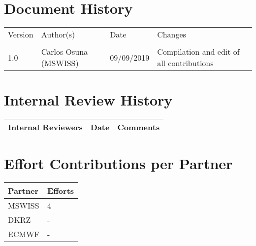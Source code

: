 \documentclass[a4paper,10pt,twoside]{article}
\begin{document}


\clearpage
%
\cleardoublepage


\tableofcontents
\listoffigures
\listoftables

%

\newpage
\mbox{}\newpage









\section{Document History}

\begin{tabular}{|l|l|l|l|}
	\hline
	Version & Author(s) & Date & Changes \\ 
	&&& \\  \hline
	1.0 & Carlos Osuna (MSWISS) & 09/09/2019 & Compilation and edit of all contributions \\ \hline
\end{tabular}

\section{Internal Review History}

\begin{tabular}{|l|l|l|}
	\hline
	Internal Reviewers & Date & Comments \\ 
\hline
\end{tabular}

\section{Effort Contributions per Partner}
\begin{tabular}{|l|l|}
	\hline
	Partner& Efforts \\  \hline
	MSWISS & 4 \\ \hline
	DKRZ & - \\ \hline
	ECMWF & - \\ \hline
\end{tabular}



\cleardoublepage
\end{document}
